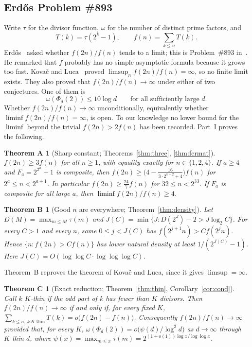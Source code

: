 \documentclass[11pt]{amsart}
\newtheorem*{theoremA}{Theorem A}
\newtheorem*{theoremB}{Theorem B}
\newtheorem*{theoremC}{Theorem C}
\theoremstyle{definition}
\theoremstyle{remark}
\begin{document}
\subsection{Erd\H{o}s Problem \#893}
Write $\tau$ for the divisor function, $\omega$ for the number of distinct prime factors, and
\[
T(k)=\tau(2^k-1),\qquad f(n)=\sum_{k\le n}T(k).
\]
Erd\H{o}s~\cite{Er98} asked whether $f(2n)/f(n)$ tends to a limit; this is Problem~\#893 in~\cite{EP}.
He remarked that $f$ probably has no simple asymptotic formula because it grows too fast.
Kova\v{c} and Luca~\cite{KL} proved $\limsup_{n}f(2n)/f(n)=\infty$, so no finite limit exists. They also proved that
$f(2n)/f(n)\to\infty$ under either of two conjectures. One of them is
\begin{equation}\label{eq:KL}
\omega(\Phi_d(2))\le 10\log d\qquad\text{for all sufficiently large } d.
\end{equation}
Whether $f(2n)/f(n)\to\infty$ unconditionally, equivalently whether $\liminf f(2n)/f(n)=\infty$, is open.
To our knowledge no lower bound for the $\liminf$ beyond the trivial $f(2n)>2f(n)$ has been recorded.
Part~I proves the following.

\begin{theoremA}[Sharp constant; Theorems~\ref{thm:three}, \ref{thm:fermat}]
$f(2n)\ge3f(n)$ for all $n\ge1$, with equality exactly for $n\in\{1,2,4\}$. If $a\ge4$ and $F_a=2^{2^a}+1$ is
composite, then $f(2n)\ge\bigl(4-\frac{16}{3\cdot2^{a-2}+4}\bigr)f(n)$ for $2^a\le n<2^{a+1}$. In particular
$f(2n)\ge\frac{24}{7}f(n)$ for $32\le n<2^{33}$. If $F_a$ is composite for all large $a$, then
$\liminf f(2n)/f(n)\ge4$.
\end{theoremA}

\begin{theoremB}[Good $n$ are everywhere; Theorem~\ref{thm:density}]
Let $D(M)=\max_{m\le M}\tau(m)$ and $J(C)=\min\{J:D(2^J)-2>J\log_2C\}$. For every $C>1$ and every $n$, some
$0\le j<J(C)$ has $f(2^{j+1}n)>Cf(2^jn)$. Hence $\{n:f(2n)>Cf(n)\}$ has lower natural density at least
$1/(2^{J(C)}-1)$. Here $J(C)=O(\log\log C\cdot\log\log\log C)$.
\end{theoremB}

Theorem~B reproves the theorem of Kova\v{c} and Luca, since it gives $\limsup=\infty$.

\begin{theoremC}[Exact reduction; Theorem~\ref{thm:thin}, Corollary~\ref{cor:cond}]
Call $k$ \emph{$K$-thin} if the odd part of $k$ has fewer than $K$ divisors. Then $f(2n)/f(n)\to\infty$ if and only if,
for every fixed $K$, $\sum_{k\le n,\ k\ K\text{-thin}}T(k)=o\bigl(f(2n)-f(n)\bigr)$. Consequently
$f(2n)/f(n)\to\infty$ provided that, for every $K$, $\omega(\Phi_d(2))=o\bigl(\psi(d)/\log^2d\bigr)$ as $d\to\infty$
through $K$-thin $d$, where $\psi(x)=\max_{m\le x}\tau(m)=2^{(1+o(1))\log x/\log\log x}$.
\end{theoremC}
\end{document}

